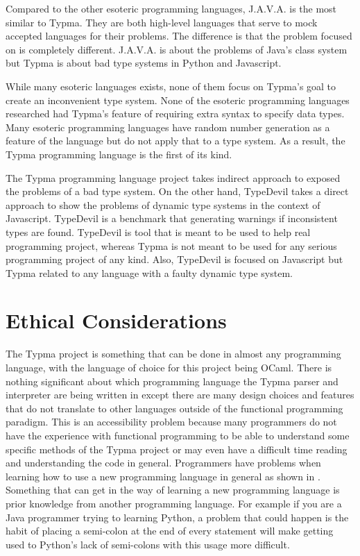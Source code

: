 \documentclass[10pt,twocolumn]{article}
\begin{document}
Compared to the other esoteric programming languages, J.A.V.A. is the most similar to Typma. They are both high-level languages that serve to mock accepted languages for their problems. The difference is that the problem focused on is completely different. J.A.V.A. is about the problems of Java's class system but Typma is about bad type systems in Python and Javascript.

While many esoteric languages exists, none of them focus on Typma's goal to create an inconvenient type system. None of the esoteric programming languages researched had Typma's feature of requiring extra syntax to specify data types. Many esoteric programming languages have random number generation as a feature of the language but do not apply that to a type system. As a result, the Typma programming language is the first of its kind.

The Typma programming language project takes indirect approach to exposed the problems of a bad type system. On the other hand, TypeDevil takes a direct approach to show the problems of dynamic type systems in the context of Javascript. TypeDevil is a benchmark that generating warnings if inconsistent types are found. TypeDevil is tool that is meant to be used to help real programming project, whereas Typma is not meant to be used for any serious programming project of any kind. Also, TypeDevil is focused on Javascript but Typma related to any language with a faulty dynamic type system. 

\section{Ethical Considerations}

The Typma project is something that can be done in almost any programming language, with the language of choice for this project being OCaml. There is nothing significant about which programming language the Typma parser and interpreter are being written in except there are many design choices and features that do not translate to other languages outside of the functional programming paradigm. This is an accessibility problem because many programmers do not have the experience with functional programming to be able to understand some specific methods of the Typma project or may even have a difficult time reading and understanding the code in general. Programmers have problems when learning how to use a new programming language in general as shown in \textcite{Shrestha2020Here}. Something that can get in the way of learning a new programming language is prior knowledge from another programming language. For example if you are a Java programmer trying to learning Python, a problem that could happen is the habit of placing a semi-colon at the end of every statement will make getting used to Python's lack of semi-colons with this usage more difficult. 
\end{document}
